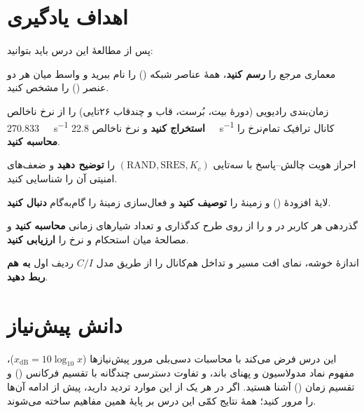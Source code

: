 \documentclass[11pt,a4paper]{article}
\begin{document}
\ACNcover

\section{اهداف یادگیری}\label{sec:objectives}
پس از مطالعهٔ این درس باید بتوانید:
\begin{objectives}
  \item معماری مرجع  را \textbf{رسم کنید}، همهٔ عناصر شبکه
        () را نام ببرید و واسط میان
        هر دو عنصر () را مشخص کنید.
  \item زمان‌بندی رادیویی  (دورهٔ بیت، بُرست، قاب  و چندقاب ۲۶تایی) را
        از نرخ ناخالص \qty{270.833}{\kilo\bit\per\second} \textbf{استخراج کنید} و نرخ
        ناخالص \qty{22.8}{\kilo\bit\per\second} کانال ترافیک تمام‌نرخ را \textbf{محاسبه کنید}.
  \item احراز هویت چالش--پاسخ  با سه‌تایی $(\text{RAND},\text{SRES},K_c)$ را
        \textbf{توضیح دهید} و ضعف‌های امنیتی آن را شناسایی کنید.
  \item لایهٔ افزودهٔ  () و زمینهٔ  را
        \textbf{توصیف کنید} و فعال‌سازی زمینهٔ  را گام‌به‌گام \textbf{دنبال کنید}.
  \item گذردهی هر کاربر در  و  را از روی طرح کدگذاری و تعداد شیارهای
        زمانی \textbf{محاسبه کنید} و مصالحهٔ میان استحکام و نرخ را \textbf{ارزیابی کنید}.
  \item اندازهٔ خوشه، نمای افت مسیر و تداخل هم‌کانال را از طریق مدل $C/I$ ردیف اول
        \textbf{به هم ربط دهید}.
\end{objectives}

\section{دانش پیش‌نیاز}\label{sec:prereq}
این درس فرض می‌کند با محاسبات دسی‌بلی مرور پیش‌نیازها
($x_{\mathrm{dB}} = 10\log_{10}x$)، مفهوم نماد مدولاسیون و پهنای باند، و تفاوت
دسترسی چندگانه با تقسیم فرکانس () و تقسیم زمان () آشنا هستید.
اگر در هر یک از این موارد تردید دارید، پیش از ادامه آن‌ها را مرور کنید؛ همهٔ نتایج
کمّی این درس بر پایهٔ همین مفاهیم ساخته می‌شوند.
\end{document}
